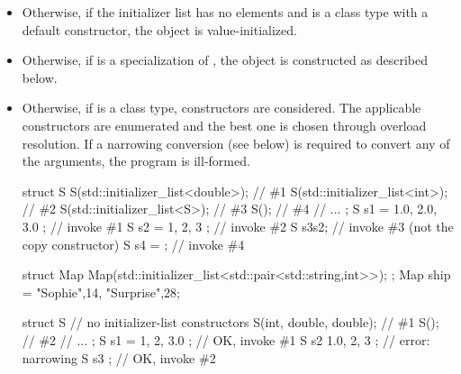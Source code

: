 \begin{itemize}
\item Otherwise, if the initializer list has no elements and  is a class type with a
default constructor, the object is value-initialized.

\item Otherwise, if  is a specialization of ,
the object is constructed as described below.

\item Otherwise, if  is a class type, constructors are considered.
The applicable constructors are enumerated and
the best one is chosen through overload resolution. If a narrowing
conversion (see below) is required to convert any of the arguments, the program is
ill-formed.

\begin{example}
\begin{codeblock}
struct S {
  S(std::initializer_list<double>); // \#1
  S(std::initializer_list<int>);    // \#2
  S(std::initializer_list<S>);      // \#3
  S();                              // \#4
  // ...
};
S s1 = { 1.0, 2.0, 3.0 };           // invoke \#1
S s2 = { 1, 2, 3 };                 // invoke \#2
S s3{s2};                           // invoke \#3 (not the copy constructor)
S s4 = { };                         // invoke \#4
\end{codeblock}
\end{example}

\begin{example}
\begin{codeblock}
struct Map {
  Map(std::initializer_list<std::pair<std::string,int>>);
};
Map ship = {{"Sophie",14}, {"Surprise",28}};
\end{codeblock}
\end{example}

\begin{example}
\begin{codeblock}
struct S {
  // no initializer-list constructors
  S(int, double, double);           // \#1
  S();                              // \#2
  // ...
};
S s1 = { 1, 2, 3.0 };               // OK, invoke \#1
S s2 { 1.0, 2, 3 };                 // error: narrowing
S s3 { };                           // OK, invoke \#2
\end{codeblock}
\end{example}


\end{itemize}
